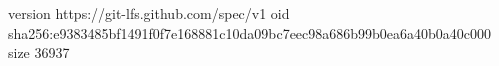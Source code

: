version https://git-lfs.github.com/spec/v1
oid sha256:e9383485bf1491f0f7e168881c10da09bc7eec98a686b99b0ea6a40b0a40c000
size 36937
